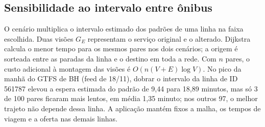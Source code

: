\subsection{Sensibilidade ao intervalo entre ônibus}\label{sec:F-ESPERA-OPC}
O cenário multiplica o intervalo estimado dos padrões de uma linha na faixa escolhida.
Duas visões $G_E$ representam o serviço original e o alterado. Dijkstra calcula o menor
tempo para os mesmos pares nos dois cenários; a origem é sorteada entre as paradas da
linha e o destino em toda a rede. Com $n$ pares, o custo adicional à montagem
das visões é $O(n(V+E)\log V)$. No pico da manhã do GTFS de BH (feed de 18/11), dobrar o
intervalo da linha de ID 561787 elevou a espera estimada do padrão de 9,44 para 18,89 minutos,
mas só 3 de 100 pares ficaram mais lentos, em média 1,35 minuto; nos outros 97, o melhor trajeto não depende dessa linha.
A aplicação mantém fixos a malha, os tempos de viagem e a oferta nas demais linhas.
